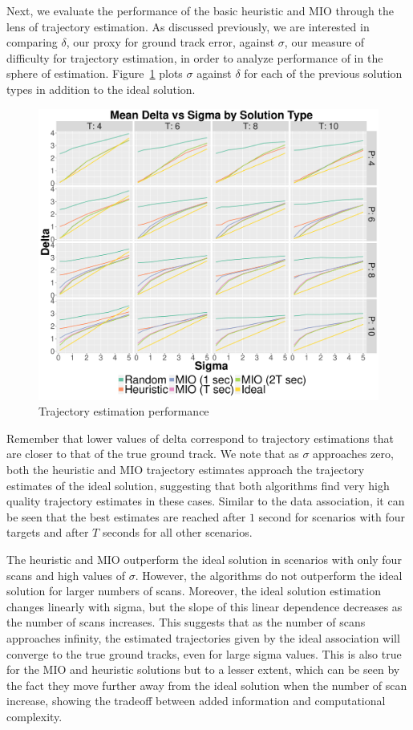 Next, we evaluate the performance of the basic heuristic and MIO through the lens of trajectory estimation. As discussed previously, we are interested in comparing $\delta$, our proxy for ground track error, against $\sigma$, our measure of difficulty for trajectory estimation, in order to analyze performance of in the sphere of estimation. Figure~\ref{Fig:Basic_Delta_Summary} plots $\sigma$ against $\delta$ for each of the previous solution types in addition to the ideal solution. 
\begin{figure}[ht]
  \centering
  \includegraphics[width=\columnwidth]{../Figures/Basic_Delta_Summary}
  \caption{Trajectory estimation performance}
  \label{Fig:Basic_Delta_Summary}
\end{figure}

Remember that lower values of delta correspond to trajectory estimations that are closer to that of the true ground track. We note that as $\sigma$ approaches zero, both the heuristic and MIO trajectory estimates approach the trajectory estimates of the ideal solution, suggesting that both algorithms find very high quality trajectory estimates in these cases. Similar to the data association, it can be seen that the best estimates are reached after $1$ second for scenarios with four targets and after $T$ seconds for all other scenarios.

The heuristic and MIO outperform the ideal solution in scenarios with only four scans and high values of $\sigma$. However, the algorithms do not outperform the ideal solution for larger numbers of scans. Moreover, the ideal solution estimation changes linearly with sigma, but the slope of this linear dependence decreases as the number of scans increases. This suggests that as the number of scans approaches infinity, the estimated trajectories given by the ideal association will converge to the true ground tracks, even for large sigma values. This is also true for the MIO and heuristic solutions but to a lesser extent, which can be seen by the fact they move further away from the ideal solution when the number of scan increase, showing the tradeoff between added information and computational complexity.

